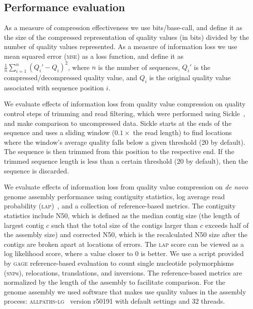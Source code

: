 \documentclass{bioinfo}
\begin{document}
\begin{methods}
\subsection{Performance evaluation}

As a measure of compression effectiveness we use bits/base-call, and
define it as the size of the compressed representation of quality
values (in bits) divided by the number of quality values represented.
As a measure of information loss we use mean squared error
(\textsc{mse}) as a loss function, and define it as
$\frac{1}{n}\sum_{i=1}^{n}{(Q_i'-Q_i)^2}$, where $n$ is the number of
sequences, $Q_i'$ is the compressed/decompressed quality value, and
$Q_i$ is the original quality value associated with sequence position
$i$.

We evaluate effects of information loss from quality value compression
on quality control steps of trimming and read filtering, which were
performed using Sickle~\citep{sickle}, and make comparison to
uncompressed data. Sickle starts at the ends of the sequence and uses
a sliding window ($0.1 \times$ the read length) to find locations
where the window's average quality falls below a given threshold (20
by default). The sequence is then trimmed from this position to the
respective end. If the trimmed sequence length is less than a certain
threshold (20 by default), then the sequence is discarded.

We evaluate effects of information loss from quality value compression
on \emph{de novo} genome assembly performance using contiguity
statistics, log average read probability
(\textsc{lap})~\citep{Ghodsi:2013hb}, and a collection of
reference-based metrics. The contiguity statistics include N50, which
is defined as the median contig size (the length of largest contig $c$
such that the total size of the contigs larger than $c$ exceeds half
of the assembly size) and corrected N50, which is the recalculated N50
size after the contigs are broken apart at locations of errors. The
\textsc{lap} score can be viewed as a log likelihood score, where a
value closer to 0 is better. We use a script provided by \textsc{gage}
reference-based evaluation to count single nucleotide polymorphisms
(\textsc{snp}s), relocations, translations, and inversions. The
reference-based metrics are normalized by the length of the assembly
to facilitate comparison. For the genome assembly we used software
that makes use quality values in the assembly process:
\textsc{allpaths-lg}~\citep{Gnerre:2011kx} version r50191 with default
settings and 32 threads.

\end{methods}
\end{document}
